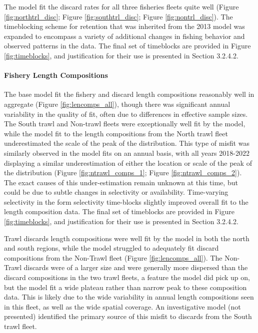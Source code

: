 \documentclass[11pt,
  letterpaper,
]{article}
\begin{document}
The model fit the discard rates for all three fisheries fleets quite well (Figure \ref{fig:northtrl_disc}; Figure \ref{fig:southtrl_disc}; Figure \ref{fig:nontrl_disc}). The timeblocking scheme for retention that was inherited from the 2013 model was expanded to encompass a variety of additional changes in fishing behavior and observed patterns in the data. The final set of timeblocks are provided in Figure \ref{fig:timeblocks}, and justification for their use is presented in Section 3.2.4.2.

\hypertarget{fishery-length-compositions-1}{%
\paragraph{Fishery Length Compositions}\label{fishery-length-compositions-1}}

The base model fit the fishery and discard length compositions reasonably well in aggregate (Figure \ref{fig:lencomps_all}), though there was significant annual variability in the quality of fit, often due to differences in effective sample sizes. The South trawl and Non-trawl fleets were exceptionally well fit by the model, while the model fit to the length compositions from the North trawl fleet underestimated the scale of the peak of the distribution. This type of misfit was similarly observed in the model fits on an annual basis, with all years 2018-2022 displaying a similar underestimation of either the location or scale of the peak of the distribution (Figure \ref{fig:ntrawl_comps_1}; Figure \ref{fig:ntrawl_comps_2}). The exact causes of this under-estimation remain unknown at this time, but could be due to subtle changes in selectivity or availability. Time-varying selectivity in the form selectivity time-blocks slightly improved overall fit to the length composition data. The final set of timeblocks are provided in Figure \ref{fig:timeblocks}, and justification for their use is presented in Section 3.2.4.2.

Trawl discards length compositions were well fit by the model in both the north and south regions, while the model struggled to adequately fit discard compositions from the Non-Trawl fleet (Figure \ref{fig:lencomps_all}). The Non-Trawl discards were of a larger size and were generally more dispersed than the discard compositions in the two trawl fleets, a feature the model did pick up on, but the model fit a wide plateau rather than narrow peak to these composition data. This is likely due to the wide variability in annual length compositions seen in this fleet, as well as the wide spatial coverage. An investigative model (not presented) identified the primary source of this misfit to discards from the South trawl fleet.
\end{document}
